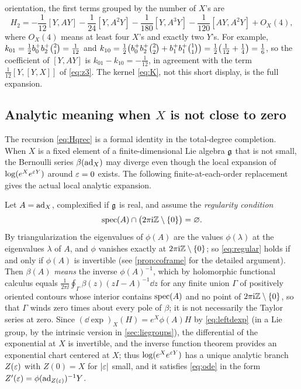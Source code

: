 orientation, the first terms grouped by the number of $X$'s are
\begin{equation}\label{eq:H2first}
 H_2=-\frac1{12}[Y,AY]-\frac1{24}[Y,A^2Y]-\frac1{180}[Y,A^3Y]
 -\frac1{120}[AY,A^2Y]+O_X(4),
\end{equation}
where $O_X(4)$ means at least four $X$'s and exactly two $Y$'s. For
example, $k_{01}=\frac12b^{+}_{0}b^{+}_{2}\binom21=\frac1{12}$ and
$k_{10}=\frac12\bigl(b^{+}_{0}b^{+}_{2}\binom22+b^{+}_{1}b^{+}_{1}\binom11\bigr)
=\frac12\bigl(\frac1{12}+\frac14\bigr)=\frac16$, so the coefficient of
$[Y,AY]$ is $k_{01}-k_{10}=-\frac1{12}$, in agreement with the term
$\frac1{12}[Y,[Y,X]]$ of \eqref{eq:z3}. The kernel \eqref{eq:K}, not this
short display, is the full expansion.

\subsection{Analytic meaning when \texorpdfstring{$X$}{X} is not close to zero}\label{sec:regularX}
The recursion \eqref{eq:Hqrec} is a formal identity in the total-degree
completion. When $X$ is a fixed element of a finite-dimensional Lie algebra
$\mathfrak{g}$ that is not small, the Bernoulli series $\beta(\operatorname{ad}_X)$ may diverge
even though the local expansion of $\log(e^Xe^{\varepsilon Y})$ around $\varepsilon=0$
exists. The following finite-at-each-order replacement gives the actual
local analytic expansion.

Let $A=\operatorname{ad}_X$, complexified if $\mathfrak{g}$ is real, and assume the
\emph{regularity condition}
\begin{equation}\label{eq:regular}
 \operatorname{spec}(A)\cap\bigl(2\pi\mathrm{i}\mathbb{Z}\setminus\{0\}\bigr)=\varnothing.
\end{equation}
By triangularization the eigenvalues of $\phi(A)$ are the values
$\phi(\lambda)$ at the eigenvalues $\lambda$ of $A$, and $\phi$ vanishes
exactly at $2\pi\mathrm{i}\mathbb{Z}\setminus\{0\}$; so \eqref{eq:regular} holds if and
only if $\phi(A)$ is invertible (see \cref{prop:coframe} for the detailed
argument). Then $\beta(A)$ \emph{means} the inverse $\phi(A)^{-1}$, which
by holomorphic functional calculus equals
$\frac1{2\pi\ii}\oint_\Gamma\beta(z)(zI-A)^{-1}\dd z$ for any finite union
$\Gamma$ of positively oriented contours whose interior contains $\operatorname{spec}(A)$
and no point of $2\pi\mathrm{i}\mathbb{Z}\setminus\{0\}$, so that $\Gamma$ winds zero
times about every pole of $\beta$; it is not necessarily the Taylor series
at zero.
Since $(\dd\exp)_X(H)=e^X\phi(A)H$ by \eqref{eq:leftdexp} (in a Lie group,
by the intrinsic version in \cref{sec:liegroups}), the differential of the
exponential at $X$ is invertible, and the inverse function theorem provides
an exponential chart centered at $X$; thus $\log(e^Xe^{\varepsilon Y})$ has a
unique analytic branch $Z(\varepsilon)$ with $Z(0)=X$ for $|\varepsilon|$ small, and it
satisfies \eqref{eq:ode} in the form $Z'(\varepsilon)=\phi(\operatorname{ad}_{Z(\varepsilon)})^{-1}Y$.

